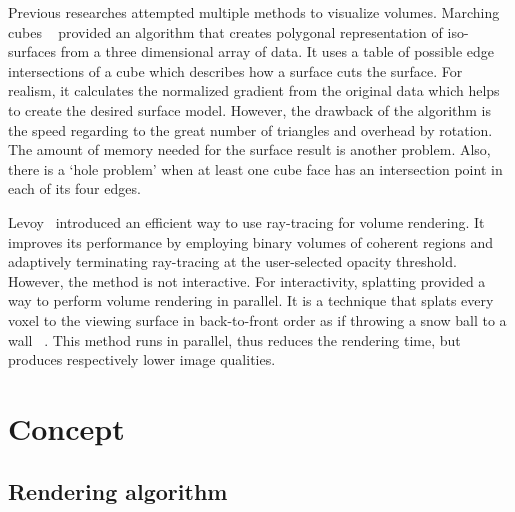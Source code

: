 \documentclass{acm_proc_article-sp}
\begin{document}
Previous researches attempted multiple methods to visualize volumes. Marching cubes ~\cite{lorensen:1987} provided an algorithm that creates polygonal representation of iso-surfaces from a three dimensional array of data. It uses a table of possible edge intersections of a cube which describes how a surface cuts the surface. For realism, it calculates the normalized gradient from the original data which helps to create the desired surface model. However, the drawback of the algorithm is the speed regarding to the great number of triangles and overhead by rotation. The amount of memory needed for the surface result is another problem. Also, there is a ‘hole problem’ when at least one cube face has an intersection point in each of its four edges.

Levoy~\cite{levoy:1990} introduced an efficient way to use ray-tracing for volume rendering. It improves its performance by employing binary volumes of coherent regions and adaptively terminating ray-tracing at the user-selected opacity threshold. However, the method is not interactive.
For interactivity, splatting provided a way to perform volume rendering in parallel. It is a technique that splats every voxel to the viewing surface in back-to-front order as if throwing a snow ball to a wall ~\cite{westover:1991}. This method runs in parallel, thus reduces the rendering time, but produces respectively lower image qualities. 


\section{Concept}
\subsection{Rendering algorithm}
\end{document}
